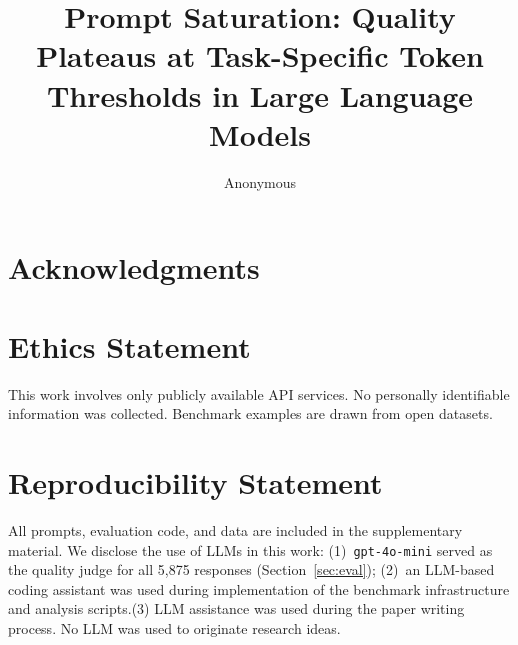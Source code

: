 \documentclass{article}
\title{Prompt Saturation: Quality Plateaus at Task-Specific Token Thresholds
       in Large Language Models}
\author{Anonymous}
\begin{document}
\ifcolmsubmission
\linenumbers
\fi

\maketitle

\renewcommand{\thefootnote}{\fnsymbol{footnote}}
\renewcommand{\thefootnote}{\arabic{footnote}}









\section*{Acknowledgments}

\section*{Ethics Statement}
This work involves only publicly available API services.
No personally identifiable information was collected.
Benchmark examples are drawn from open datasets.

\section*{Reproducibility Statement}
All prompts, evaluation code, and data are included in the supplementary material.
We disclose the use of LLMs in this work:
(1)~\texttt{gpt-4o-mini} served as the quality judge for all 5,875 responses
(Section~\ref{sec:eval});
(2)~an LLM-based coding assistant was used during implementation of the
benchmark infrastructure and analysis scripts.(3) LLM assistance was used during the paper writing process. 
No LLM was used to originate research ideas.




\appendix

\end{document}
